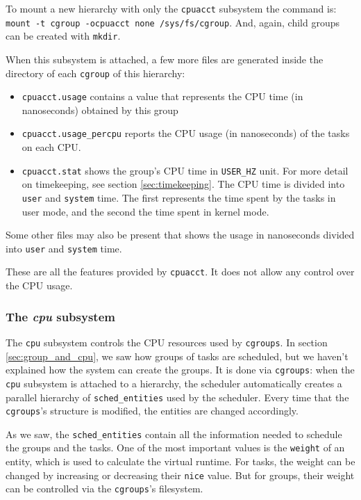 To mount a new hierarchy with only the \verb|cpuacct| subsystem the command is: \verb|mount -t cgroup -ocpuacct none /sys/fs/cgroup|. And, again, child groups can be created with \verb|mkdir|.

When this subsystem is attached, a few more files are generated inside the directory of each \verb|cgroup| of this hierarchy:
\begin{itemize}
    \item \verb|cpuacct.usage| contains a value that represents the CPU time (in nanoseconds) obtained  by this group
    \item \verb|cpuacct.usage_percpu| reports the CPU usage (in nanoseconds) of the tasks on each CPU.
    \item \verb|cpuacct.stat| shows the group's CPU time in \verb|USER_HZ| unit. For more detail on timekeeping, see section \ref{sec:timekeeping}. The CPU time is divided into \verb|user| and \verb|system| time. The first represents the time spent by the tasks in user mode, and the second the time spent in kernel mode.
\end{itemize}
Some other files may also be present that shows the usage in nanoseconds divided into \verb|user| and \verb|system| time.

These are all the features provided by \verb|cpuacct|. It does not allow any control over the CPU usage.

\subsubsection{The \textit{cpu} subsystem}

The \verb|cpu| subsystem controls the CPU resources used by \verb|cgroups|. In section \ref{sec:group_and_cpu}, we saw how groups of tasks are scheduled, but we haven't explained how the system can create the groups. It is done via \verb|cgroups|: when the \verb|cpu| subsystem is attached to a hierarchy, the scheduler automatically creates a parallel hierarchy of \verb|sched_entities| used by the scheduler. Every time that the \verb|cgroups|'s structure is modified, the entities are changed accordingly. 

As we saw, the \verb|sched_entities| contain all the information needed to schedule the groups and the tasks. One of the most important values is the \verb|weight| of an entity, which is used to calculate the virtual runtime. For tasks, the weight can be changed by increasing or decreasing their \verb|nice| value. But for groups, their weight can be controlled via the \verb|cgroups|'s filesystem.

